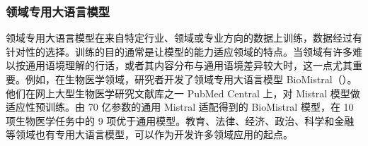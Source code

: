 \subsubsection{领域专用大语言模型}
领域专用大语言模型在来自特定行业、领域或专业方向的数据上训练，数据经过有针对性的选择。训练的目的通常是让模型的能力适应领域的特点。当领域有许多难以按通用语境理解的行话，或者其内容分布与通用语境差异较大时，这一点尤其重要。例如，在生物医学领域，研究者开发了领域专用大语言模型 BioMistral（）。他们在网上大型生物医学研究文献库之一 PubMed Central 上，对 Mistral 模型做适应性预训练。由 70 亿参数的通用 Mistral 适配得到的 BioMistral 模型，在 10 项生物医学任务中的 9 项优于通用模型。教育、法律、经济、政治、科学和金融等领域也有专用大语言模型，可以作为开发许多领域应用的起点。
